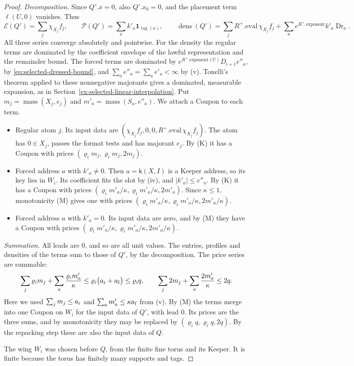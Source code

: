 \begin{proof}
\emph{Decomposition.} Since $Q'.x=0$, also $Q'.x_0=0$, and the placement
term $\ell(U,0)$ vanishes. Thus
\[
 \mathcal E(Q')=\sum_j\chi_{X_j}f_j,\qquad
 \mathcal P(Q')=\sum_a k'_a\mathbf 1_{\operatorname{tag}(a)},\qquad
 \operatorname{dens}(Q')=\sum_jR^+.\mathrm{eval}\,\chi_{X_j}f_j
   +\sum_ae^{R^+.\mathrm{exponent}}k'_a\operatorname{Dr}_a .
\]
All three series converge absolutely and pointwise. For the density the
regular terms are dominated by the coefficient envelope of the lawful
representation and the remainder bound. The forced terms are dominated
by $e^{R^+.\mathrm{exponent}(U)}D_{i+1}e''_a$, by
\eqref{eq:selected-dressed-bound}, and $\sum_ae''_a=\sum_ae'_a<\infty$
by (v). Tonelli's
theorem applied to these nonnegative majorants gives a dominated,
measurable expansion, as in
Section~\ref{ex-selected-linear-interpolation}. Put
$m_j=\operatorname{mass}(X_j,e_j)$ and
$m'_a=\operatorname{mass}(S_a,e''_a)$. We attach a Coupon to each term.
\begin{itemize}
\item Regular atom $j$. Its input data are
  $(\chi_{X_j}f_j,0,0,R^+.\mathrm{eval}\,\chi_{X_j}f_j)$. The atom has
  $0\in X_j$, passes the format tests and has majorant $e_j$. By (K) it
  has a Coupon with prices $(\varrho_im_j,\varrho_im_j,2m_j)$.
\item Forced address $a$ with $k'_a\ne0$. Then $a=\mathsf k(X,I)$ is a
  Keeper address, so its key lies in $W_i$. Its coefficient fits the
  slot by (iv), and $|k'_a|\le e''_a$. By (K) it has a Coupon with
  prices $(\varrho_im'_a/\kappa,\varrho_im'_a/\kappa,2m'_a)$. Since
  $\kappa\le1$, monotonicity (M) gives one with prices
  $(\varrho_im'_a/\kappa,\varrho_im'_a/\kappa,2m'_a/\kappa)$.
\item Forced address $a$ with $k'_a=0$. Its input data are zero, and
  by (M) they have a Coupon with prices
  $(\varrho_im'_a/\kappa,\varrho_im'_a/\kappa,2m'_a/\kappa)$.
\end{itemize}

\emph{Summation.} All leads are $0$, and so are all unit values. The
entries, profiles and densities of the terms sum to those of $Q'$, by
the decomposition. The price series are summable:
\[
 \sum_j\varrho_im_j+\sum_a\frac{\varrho_im'_a}{\kappa}
 \le\varrho_i\bigl(a_{\rm r}+a_{\rm f}\bigr)\le\varrho_iq,
 \qquad
 \sum_j2m_j+\sum_a\frac{2m'_a}{\kappa}\le2q .
\]
Here we used $\sum_jm_j\le a_{\rm r}$ and
$\sum_am'_a\le\kappa a_{\rm f}$ from (v). By (M) the terms merge into
one Coupon on $W_i$ for the input data of $Q'$, with lead $0$. Its
prices are the three sums, and by monotonicity they may be replaced by
$(\varrho_iq,\varrho_iq,2q)$. By the repacking step these are also the
input data of $Q$.

The wing $W_i$ was chosen before $Q$, from the finite fine torus and
its Keeper. It is finite because the torus has finitely many supports
and tags.
\end{proof}

